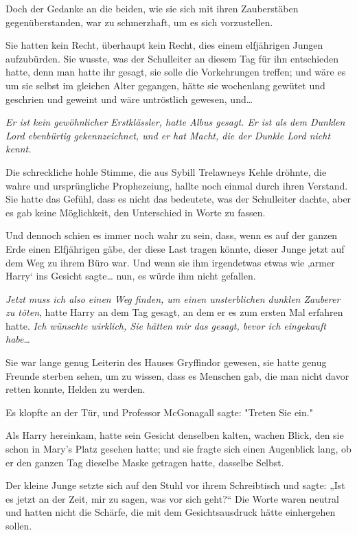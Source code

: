 {Doch der Gedanke an die beiden, wie sie sich mit ihren Zauberstäben gegenüberstanden, war zu schmerzhaft, um es sich vorzustellen.

Sie hatten kein Recht, überhaupt kein Recht, dies einem elfjährigen Jungen aufzubürden. Sie wusste, was der Schulleiter an diesem Tag für ihn entschieden hatte, denn man hatte ihr gesagt, sie solle die Vorkehrungen treffen; und wäre es um sie selbst im gleichen Alter gegangen, hätte sie wochenlang gewütet und geschrien und geweint und wäre untröstlich gewesen, und…

\emph{\emph{Er ist kein gewöhnlicher Erstklässler,} hatte Albus gesagt. \emph{Er ist als dem Dunklen Lord ebenbürtig gekennzeichnet, und er hat Macht, die der Dunkle Lord nicht kennt.}}

Die schreckliche hohle Stimme, die aus Sybill Trelawneys Kehle dröhnte, die wahre und ursprüngliche Prophezeiung, hallte noch einmal durch ihren Verstand. Sie hatte das Gefühl, dass es nicht das bedeutete, was der Schulleiter dachte, aber es gab keine Möglichkeit, den Unterschied in Worte zu fassen.

Und dennoch schien es immer noch wahr zu sein, dass, wenn es auf der ganzen Erde einen Elfjährigen gäbe, der diese Last tragen könnte, dieser Junge jetzt auf dem Weg zu ihrem Büro war. Und wenn sie ihm irgendetwas etwas wie ‚armer Harry` ins Gesicht sagte… nun, es würde ihm nicht gefallen.

\emph{Jetzt muss ich also einen Weg finden, um einen unsterblichen dunklen Zauberer zu töten}, hatte Harry an dem Tag gesagt, an dem er es zum ersten Mal erfahren hatte. \emph{Ich wünschte wirklich, Sie hätten mir das gesagt, bevor ich eingekauft habe}…

Sie war lange genug Leiterin des Hauses Gryffindor gewesen, sie hatte genug Freunde sterben sehen, um zu wissen, dass es Menschen gab, die man nicht davor retten konnte, Helden zu werden.

Es klopfte an der Tür, und Professor McGonagall sagte: "Treten Sie ein."

Als Harry hereinkam, hatte sein Gesicht denselben kalten, wachen Blick, den sie schon in Mary's Platz gesehen hatte; und sie fragte sich einen Augenblick lang, ob er den ganzen Tag dieselbe Maske getragen hatte, dasselbe Selbst.

Der kleine Junge setzte sich auf den Stuhl vor ihrem Schreibtisch und sagte: „Ist es jetzt an der Zeit, mir zu sagen, was vor sich geht?“ Die Worte waren neutral und hatten nicht die Schärfe, die mit dem Gesichtsausdruck hätte einhergehen sollen.

}

